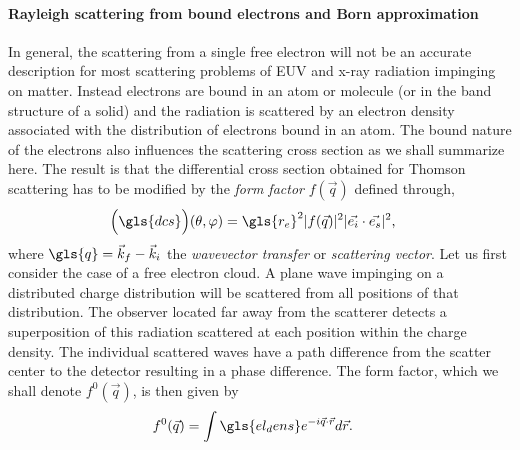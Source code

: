 \paragraph{Rayleigh scattering from bound electrons and Born approximation}
In general, the scattering from a single free electron will not be an accurate description for most scattering problems of EUV and x-ray radiation impinging on matter. Instead electrons are bound in an atom or molecule (or in the band structure of a solid) and the radiation is scattered by an electron density associated with the distribution of electrons bound in an atom. The bound nature of the electrons also influences the scattering cross section as we shall summarize here. The result is that the differential cross section obtained for Thomson scattering has to be modified by the \emph{form factor} $f(\vec{q})$ defined through,
\begin{align}
\Big(\gls{dcs}\Big)(\theta, \varphi) &= \gls{r_e}^2 |f(\vec{q})|^2 |\vec{e_i} \cdot \vec{e_s}|^2 \text{,} \label{ch_theo:eqn_atomic_form_factor}
\end{align}
where $\gls{q} = \vec{k}_f - \vec{k}_{i}$ the \emph{wavevector transfer} or \emph{scattering vector}. Let us first consider the case of a free electron cloud. A plane wave impinging on a distributed charge distribution will be scattered from all positions of that distribution. The observer located far away from the scatterer detects a superposition of this radiation scattered at each position within the charge density. The individual scattered waves have a path difference from the scatter center to the detector resulting in a phase difference. The form factor, which we shall denote $f^{0}(\vec{q})$, is then given by
\begin{align}
f^0(\vec{q}) &= \int \gls{el_dens} e^{- i \vec{q} \cdot \vec{r}} d \vec{r} \text{.} \label{ch_theo:eqn_atomic_form_factor_free}
\end{align}
